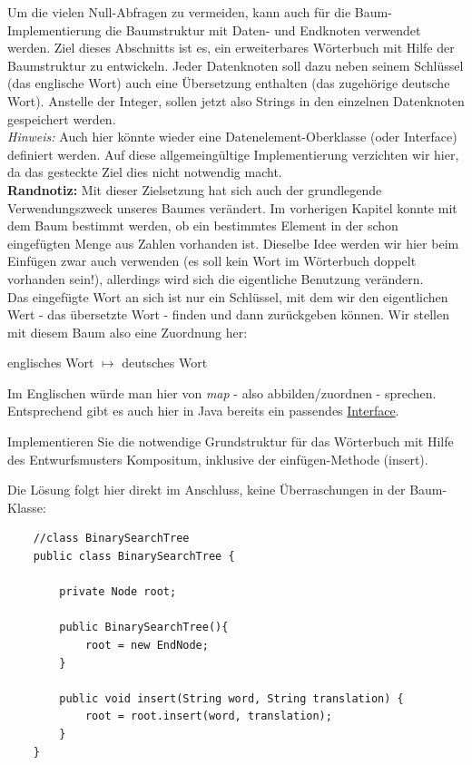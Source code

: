 \documentclass{article}
\begin{document}
Um die vielen Null-Abfragen zu vermeiden, kann auch für die Baum-Implementierung die Baumstruktur mit Daten- und Endknoten verwendet werden. Ziel dieses Abschnitts ist es, ein erweiterbares Wörterbuch mit Hilfe der Baumstruktur zu entwickeln. Jeder Datenknoten soll dazu neben seinem Schlüssel (das englische Wort) auch eine Übersetzung enthalten (das zugehörige deutsche Wort). Anstelle der Integer, sollen jetzt also Strings in den einzelnen Datenknoten gespeichert werden. \\
\textit{Hinweis:} Auch hier könnte wieder eine Datenelement-Oberklasse (oder Interface) definiert werden. Auf diese allgemeingültige Implementierung verzichten wir hier, da das gesteckte Ziel dies nicht notwendig macht.  \\
\textbf{Randnotiz:} Mit dieser Zielsetzung hat sich auch der grundlegende Verwendungszweck unseres Baumes verändert. Im vorherigen Kapitel konnte mit dem Baum bestimmt werden, ob ein bestimmtes Element in der schon eingefügten Menge aus Zahlen vorhanden ist. Dieselbe Idee werden wir hier beim Einfügen zwar auch verwenden (es soll kein Wort im Wörterbuch doppelt vorhanden sein!), allerdings wird sich die eigentliche Benutzung verändern. \\
Das eingefügte Wort an sich ist nur ein Schlüssel, mit dem wir den eigentlichen Wert - das übersetzte Wort - finden und dann zurückgeben können. Wir stellen mit diesem Baum also eine Zuordnung her:
\begin{center}
    englisches Wort $\mapsto$ deutsches Wort
\end{center}
Im Englischen würde man hier von \textit{map} - also abbilden/zuordnen - sprechen. Entsprechend gibt es auch hier in Java bereits ein passendes \href{https://docs.oracle.com/javase/8/docs/api/java/util/Map.html}{Interface}.

\begin{task}{1}
    Implementieren Sie die notwendige Grundstruktur für das Wörterbuch mit Hilfe des Entwurfsmusters Kompositum, inklusive der einfügen-Methode (insert).
\end{task}

Die Lösung folgt hier direkt im Anschluss, keine Überraschungen in der Baum-Klasse:
\begin{verbatim}
    //class BinarySearchTree 
    public class BinarySearchTree {

        private Node root;

        public BinarySearchTree(){
            root = new EndNode;
        }

        public void insert(String word, String translation) {
            root = root.insert(word, translation);
        }
    }
\end{verbatim}
\end{document}
